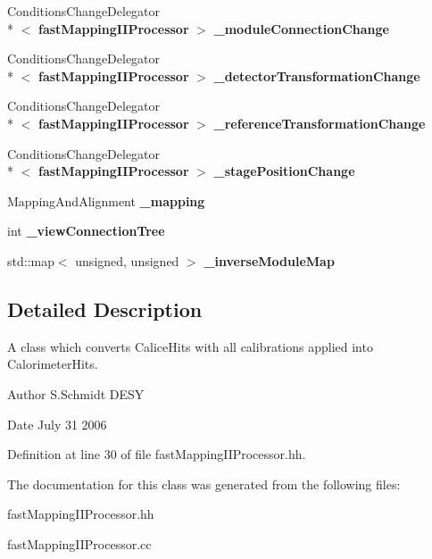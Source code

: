 \begin{DoxyCompactItemize}
\item 
Conditions\-Change\-Delegator\\*
$<$ {\bf fast\-Mapping\-I\-I\-Processor} $>$ {\bfseries \-\_\-module\-Connection\-Change}\label{classCALICE_1_1fastMappingIIProcessor_a1313dddb8ca17fb34b960428e1458635}

\item 
Conditions\-Change\-Delegator\\*
$<$ {\bf fast\-Mapping\-I\-I\-Processor} $>$ {\bfseries \-\_\-detector\-Transformation\-Change}\label{classCALICE_1_1fastMappingIIProcessor_ad0ad5353b297ad496673e4cddb12b4b6}

\item 
Conditions\-Change\-Delegator\\*
$<$ {\bf fast\-Mapping\-I\-I\-Processor} $>$ {\bfseries \-\_\-reference\-Transformation\-Change}\label{classCALICE_1_1fastMappingIIProcessor_a237eeddbe142d84c163d3449224ec161}

\item 
Conditions\-Change\-Delegator\\*
$<$ {\bf fast\-Mapping\-I\-I\-Processor} $>$ {\bfseries \-\_\-stage\-Position\-Change}\label{classCALICE_1_1fastMappingIIProcessor_a5f259d239bffa8e68990f72199009810}

\item 
Mapping\-And\-Alignment {\bfseries \-\_\-mapping}\label{classCALICE_1_1fastMappingIIProcessor_ad9dbad825d7b12c0e384651966588f32}

\item 
int {\bfseries \-\_\-view\-Connection\-Tree}\label{classCALICE_1_1fastMappingIIProcessor_a5512a3532b85add946d846b64112ff3c}

\item 
std\-::map$<$ unsigned, unsigned $>$ {\bfseries \-\_\-inverse\-Module\-Map}\label{classCALICE_1_1fastMappingIIProcessor_a608616991c0a6a9aacc5230b676d059c}

\end{DoxyCompactItemize}


\subsection{Detailed Description}
A class which converts Calice\-Hits with all calibrations applied into Calorimeter\-Hits. 

\begin{DoxyAuthor}{Author}
S.\-Schmidt D\-E\-S\-Y 
\end{DoxyAuthor}
\begin{DoxyDate}{Date}
July 31 2006 
\end{DoxyDate}


Definition at line 30 of file fast\-Mapping\-I\-I\-Processor.\-hh.



The documentation for this class was generated from the following files\-:\begin{DoxyCompactItemize}
\item 
fast\-Mapping\-I\-I\-Processor.\-hh\item 
fast\-Mapping\-I\-I\-Processor.\-cc\end{DoxyCompactItemize}
